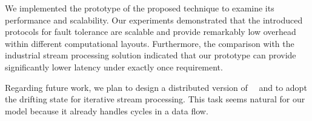We implemented the prototype of the proposed technique to examine its performance and scalability. Our experiments demonstrated that the introduced protocols for fault tolerance are scalable and provide remarkably low overhead within different computational layouts. Furthermore, the comparison with the industrial stream processing solution indicated that our prototype can provide significantly lower latency under exactly once requirement.

Regarding future work, we plan to design a distributed version of ~\Acker\ and to adopt the drifting state for iterative stream processing. This task seems natural for our model because it already handles cycles in a data flow. 
